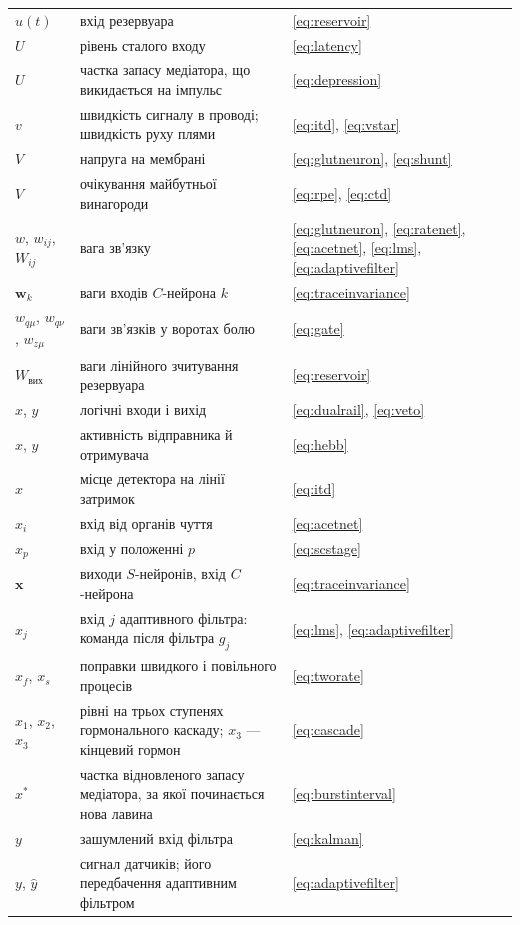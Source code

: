 \begin{center}
\begin{longtable}{>{\raggedright}p{2.0cm}>{\raggedright}p{9.6cm}>{\raggedright\arraybackslash}p{2.4cm}}
$u(t)$ & вхід резервуара & \eqref{eq:reservoir} \\
$U$ & рівень сталого входу & \eqref{eq:latency} \\
$U$ & частка запасу медіатора, що викидається на імпульс & \eqref{eq:depression} \\
$v$ & швидкість сигналу в проводі; швидкість руху плями & \eqref{eq:itd}, \eqref{eq:vstar} \\
$V$ & напруга на мембрані & \eqref{eq:glutneuron}, \eqref{eq:shunt} \\
$V$ & очікування майбутньої винагороди & \eqref{eq:rpe}, \eqref{eq:ctd} \\
$w$, $w_{ij}$, $W_{ij}$ & вага зв'язку & \eqref{eq:glutneuron}, \eqref{eq:ratenet}, \eqref{eq:acetnet}, \eqref{eq:lms}, \eqref{eq:adaptivefilter} \\
$\mathbf w_k$ & ваги входів $C$-нейрона $k$ & \eqref{eq:traceinvariance} \\
$w_{q\mu}$, $w_{q\nu}$, $w_{z\mu}$ & ваги зв'язків у воротах болю & \eqref{eq:gate} \\
$W_{\text{вих}}$ & ваги лінійного зчитування резервуара & \eqref{eq:reservoir} \\
$x$, $y$ & логічні входи і вихід & \eqref{eq:dualrail}, \eqref{eq:veto} \\
$x$, $y$ & активність відправника й отримувача & \eqref{eq:hebb} \\
$x$ & місце детектора на лінії затримок & \eqref{eq:itd} \\
$x_i$ & вхід від органів чуття & \eqref{eq:acetnet} \\
$x_p$ & вхід у положенні $p$ & \eqref{eq:scstage} \\
$\mathbf x$ & виходи $S$-нейронів, вхід $C$-нейрона & \eqref{eq:traceinvariance} \\
$x_j$ & вхід $j$ адаптивного фільтра: команда після фільтра $g_j$ & \eqref{eq:lms}, \eqref{eq:adaptivefilter} \\
$x_f$, $x_s$ & поправки швидкого і повільного процесів & \eqref{eq:tworate} \\
$x_1$, $x_2$, $x_3$ & рівні на трьох ступенях гормонального каскаду; $x_3$ --- кінцевий гормон & \eqref{eq:cascade} \\
$x^*$ & частка відновленого запасу медіатора, за якої починається нова лавина & \eqref{eq:burstinterval} \\
$y$ & зашумлений вхід фільтра & \eqref{eq:kalman} \\
$y$, $\hat y$ & сигнал датчиків; його передбачення адаптивним фільтром & \eqref{eq:adaptivefilter} \\

\end{longtable}
\end{center}
